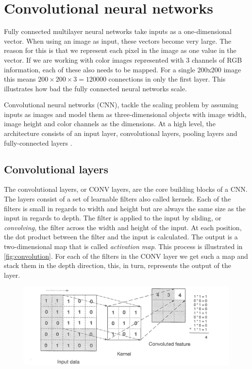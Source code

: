 \section{Convolutional neural networks}
Fully connected multilayer neural networks take inputs as a one-dimensional vector. When using an image as input, these vectors become very large. The reason for this is that we represent each pixel in the image as one value in the vector. If we are working with color images represented with 3 channels of RGB information, each of these also needs to be mapped. For a single 200x200 image this means $200 \times 200 \times 3 = 120000$ connections in only the first layer. This illustrates how bad the fully connected neural networks scale.

Convolutional neural networks (CNN), tackle the scaling problem by assuming inputs as images and model them as three-dimensional objects with image width, image height and color channels as the dimensions. At a high level, the architecture consists of an input layer, convolutional layers, pooling layers and fully-connected layers \cite{Patterson2017}. 

\subsection{Convolutional layers}
The convolutional layers, or CONV layers, are the core building blocks of a CNN. The layers consist of a set of learnable filters also called kernels. Each of the filters is small in regards to width and height but are always the same size as the input in regards to depth. The filter is applied to the input by sliding, or \emph{convolving}, the filter across the width and height of the input. At each position, the dot product between the filter and the input is calculated. The output is a two-dimensional map that is called \emph{activation map}. This process is illustrated in \autoref{fig:convolution}. For each of the filters in the CONV layer we get such a map and stack them in the depth direction, this, in turn, represents the output of the layer. 

\begin{figure}[H]
    \centering
    \includegraphics[width=\linewidth]{fig/convolution.png}
    \label{fig:convolution}
\end{figure}

